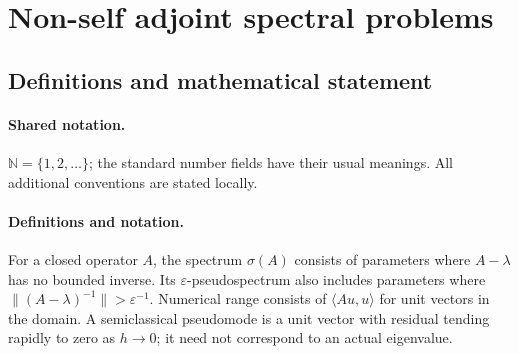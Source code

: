 \documentclass[11pt]{article}
\begin{document}
\section{Non-self adjoint spectral problems}\label{statement}

\subsection{Definitions and mathematical statement}

\paragraph{Shared notation.}$\mathbb N=\{1,2,\ldots\}$; the standard number fields have their usual meanings. All additional conventions are stated locally.


\paragraph{Definitions and notation.}For a closed operator $A$, the spectrum $\sigma(A)$ consists of parameters where $A-\lambda$ has no bounded inverse. Its $\varepsilon$-pseudospectrum also includes parameters where $\|(A-\lambda)^{-1}\|>\varepsilon^{-1}$. Numerical range consists of $\langle Au,u\rangle$ for unit vectors in the domain. A semiclassical pseudomode is a unit vector with residual tending rapidly to zero as $h\to0$; it need not correspond to an actual eigenvalue.
\end{document}
